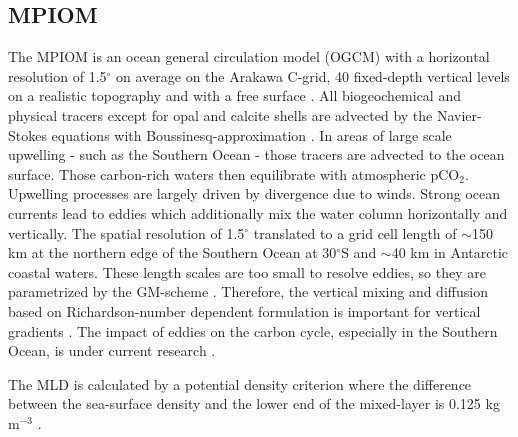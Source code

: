 \subsection{MPIOM}
\label{sec:mpiom}
The \ac{MPIOM} is an ocean general circulation model (OGCM) with a horizontal resolution of 1.5$^\circ$ on average on the Arakawa C-grid, 40 fixed-depth vertical levels on a realistic topography and with a free surface \citep{Jungclaus2013}. All biogeochemical and physical tracers except for opal and calcite shells are advected by the Navier-Stokes equations with Boussinesq-approximation \citep{Marsland2003}. In areas of large scale upwelling - such as the Southern Ocean - those tracers are advected to the ocean surface. Those carbon-rich waters then equilibrate with atmospheric pCO$_2$. Upwelling processes are largely driven by divergence due to winds. Strong ocean currents lead to eddies which additionally mix the water column horizontally and vertically. The spatial resolution of 1.5$^\circ$ translated to a grid cell length of $\sim$150 km at the northern edge of the Southern Ocean at 30$^\circ$S and $\sim$40 km in Antarctic coastal waters. These length scales are too small to resolve eddies, so they are parametrized by the GM-scheme \citep{Gent1995}. Therefore, the vertical mixing and diffusion based on Richardson-number dependent formulation is important for vertical gradients \citep{Pacanowski1981}. The impact of eddies on the carbon cycle, especially in the Southern Ocean, is under current research \citep{Lauderdale2013,Dufour2013,Gnanadesikan2015}.

The \ac{MLD} is calculated by a potential density criterion where the difference between the sea-surface density and the lower end of the mixed-layer is 0.125 kg m$^{-3}$ \citep{Jungclaus2013}. 





